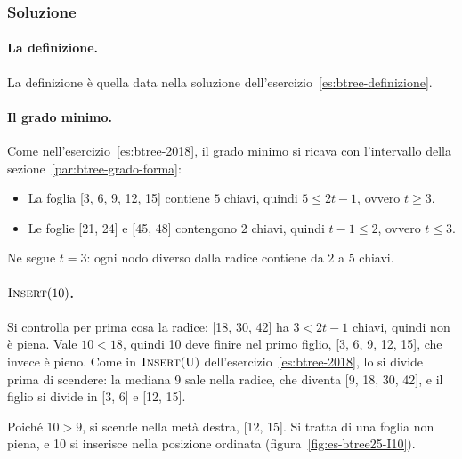 \subsubsection*{Soluzione}

\paragraph{La definizione.}
La definizione è quella data nella soluzione dell'esercizio~\ref{es:btree-definizione}.

\paragraph{Il grado minimo.}
Come nell'esercizio~\ref{es:btree-2018}, il grado minimo si ricava con l'intervallo della sezione~\ref{par:btree-grado-forma}:
\begin{itemize}
    \item La foglia [3, 6, 9, 12, 15] contiene $5$ chiavi, quindi $5 \le 2t-1$, ovvero $t \ge 3$.
    \item Le foglie [21, 24] e [45, 48] contengono $2$ chiavi, quindi $t-1 \le 2$, ovvero $t \le 3$.
\end{itemize}

Ne segue $t = 3$: ogni nodo diverso dalla radice contiene da $2$ a $5$ chiavi.

\paragraph{$\textsc{Insert}(10)$.}
Si controlla per prima cosa la radice: [18, 30, 42] ha $3 < 2t-1$ chiavi, quindi non è piena. Vale $10 < 18$, quindi 10 deve finire nel primo figlio, [3, 6, 9, 12, 15], che invece è pieno. Come in $\textsc{Insert}(\mathrm{U})$ dell'esercizio~\ref{es:btree-2018}, lo si divide prima di scendere: la mediana 9 sale nella radice, che diventa [9, 18, 30, 42], e il figlio si divide in [3, 6] e [12, 15].

Poiché $10 > 9$, si scende nella metà destra, [12, 15]. Si tratta di una foglia non piena, e 10 si inserisce nella posizione ordinata (figura~\ref{fig:es-btree25-I10}).

